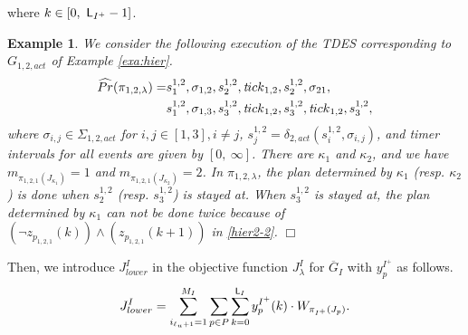 \documentclass{article}
\newcommand{\qedwhite}{\hfill \ensuremath{\Box}}
\newtheorem{exa}{Example}
\newcommand{\req}[1]{\eqref{#1}}
\renewcommand{\Pr}{\widehat{Pr}}
\newcommand{\ttick}{{\textit tick}}
\newcommand{\Len}{{\sf L}}
\begin{document}
where $k\in[0,~\Len_{I^+}-1]$.
%
\begin{exa}
We consider the following execution of the TDES corresponding to $G_{1,2,act}$ of Example \ref{exa:hier}.
\begin{align}
\Pr(\pi_{1,2,\lambda})
=&s^{1,2}_1,\sigma_{1,2},s^{1,2}_2,\ttick_{1,2},s^{1,2}_2,\sigma_{21},\notag \\
&s^{1,2}_1,\sigma_{1,3},s^{1,2}_3,\ttick_{1,2},s^{1,2}_3,\ttick_{1,2},s^{1,2}_3,\notag
\end{align}
where $\sigma_{i,j}\in\Sigma_{1,2,act}$ for $i,j\in[1,3],i\neq j$, $s^{1,2}_j=\delta_{2,act}(s_i^{1,2},\sigma_{i,j})$, and timer intervals for all events are given by $[0,~\infty]$.
There are $\kappa_1$ and $\kappa_2$, and we have $m_{\pi_{1,2,1}(J_{\kappa_1})}=1$ and $m_{\pi_{1,2,1}(J_{\kappa_2})}=2$.
In $\pi_{1,2,\lambda}$, the plan determined by $\kappa_1$ ({\sl resp.} $\kappa_2$) is done when $s^{1,2}_2$  ({\sl resp.} $s^{1,2}_3$) is stayed at.
When $s^{1,2}_3$ is stayed at, the plan determined by $\kappa_1$ can not be done twice because of $(\lnot z_{p_{1,2,1}}(k))\land (z_{p_{1,2,1}}(k+1))$ in \req{hier2-2}.
\qedwhite
\end{exa}
%
%
Then, we introduce $J_{lower}^I$ in the objective function $J_{\lambda}^I$ for $\overline{G}_I$ with ${y}^{{I^+}}_p$ as follows.
\begin{align}\label{obj:3}
J_{lower}^I=\sum_{i_{\ell_u +1}=1}^{M_I} \sum_{p\in P} \sum_{k=0}^{\Len_I} {y}^{I^+}_p(k) \cdot {W_{\pi_{I^+}(J_p)}}.
\end{align}
%
\end{document}
